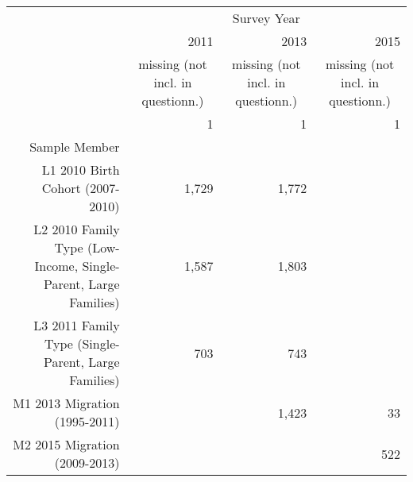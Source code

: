 \documentclass{article}
\begin{document}
\begin{tabular}{llll}
\cline{1-4}
\multicolumn{1}{c}{} &
  \multicolumn{3}{|c}{Survey Year} \\
\multicolumn{1}{c}{} &
  \multicolumn{1}{|r}{2011} &
  \multicolumn{1}{r}{2013} &
  \multicolumn{1}{r}{2015} \\
\multicolumn{1}{c}{} &
  \multicolumn{1}{|c}{missing (not incl. in questionn.)} &
  \multicolumn{1}{c}{missing (not incl. in questionn.)} &
  \multicolumn{1}{c}{missing (not incl. in questionn.)} \\
\multicolumn{1}{c}{} &
  \multicolumn{1}{|r}{1} &
  \multicolumn{1}{r}{1} &
  \multicolumn{1}{r}{1} \\
\cline{1-4}
\multicolumn{1}{r}{Sample Member} &
  \multicolumn{1}{|r}{} &
  \multicolumn{1}{r}{} &
  \multicolumn{1}{r}{} \\
\multicolumn{1}{r}{L1 2010 Birth Cohort (2007-2010)\hspace{1em}} &
  \multicolumn{1}{|r}{1,729} &
  \multicolumn{1}{r}{1,772} &
  \multicolumn{1}{r}{} \\
\multicolumn{1}{r}{L2 2010 Family Type (Low-Income, Single-Parent, Large Families)\hspace{1em}} &
  \multicolumn{1}{|r}{1,587} &
  \multicolumn{1}{r}{1,803} &
  \multicolumn{1}{r}{} \\
\multicolumn{1}{r}{L3 2011 Family Type (Single-Parent, Large Families)\hspace{1em}} &
  \multicolumn{1}{|r}{703} &
  \multicolumn{1}{r}{743} &
  \multicolumn{1}{r}{} \\
\multicolumn{1}{r}{M1 2013 Migration (1995-2011)\hspace{1em}} &
  \multicolumn{1}{|r}{} &
  \multicolumn{1}{r}{1,423} &
  \multicolumn{1}{r}{33} \\
\multicolumn{1}{r}{M2 2015 Migration (2009-2013)\hspace{1em}} &
  \multicolumn{1}{|r}{} &
  \multicolumn{1}{r}{} &
  \multicolumn{1}{r}{522} \\
\cline{1-4}
\end{tabular}
\end{document}
